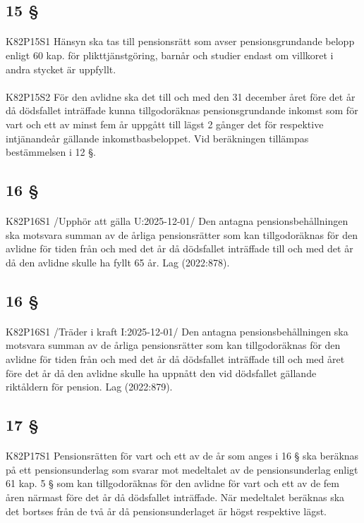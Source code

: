 \documentclass[a4paper,notitlepage,openany,10pt]{book}
\begin{document}
\subsection*{15 §}
\paragraph*{}
{\tiny K82P15S1}
Hänsyn ska tas till pensionsrätt som avser pensionsgrundande belopp enligt 60 kap. för plikttjänstgöring, barnår och studier endast om villkoret i andra stycket är uppfyllt.
\paragraph*{}
{\tiny K82P15S2}
För den avlidne ska det till och med den 31 december året före det år då dödsfallet inträffade kunna tillgodoräknas pensionsgrundande inkomst som för vart och ett av minst fem år uppgått till lägst 2 gånger det för respektive intjänandeår gällande inkomstbasbeloppet. Vid beräkningen tillämpas bestämmelsen i 12 §.
\subsection*{16 §}
\paragraph*{}
{\tiny K82P16S1}
/Upphör att gälla U:2025-12-01/
Den antagna pensionsbehållningen ska motsvara summan av de årliga pensionsrätter som kan tillgodoräknas för den avlidne för tiden från och med det år då dödsfallet inträffade till och med det år då den avlidne skulle ha fyllt 65 år.
Lag (2022:878).
\subsection*{16 §}
\paragraph*{}
{\tiny K82P16S1}
/Träder i kraft I:2025-12-01/
Den antagna pensionsbehållningen ska motsvara summan av de årliga pensionsrätter som kan tillgodoräknas för den avlidne för tiden från och med det år då dödsfallet inträffade till och med året före det år då den avlidne skulle ha uppnått den vid dödsfallet gällande riktåldern för pension.
Lag (2022:879).
\subsection*{17 §}
\paragraph*{}
{\tiny K82P17S1}
Pensionsrätten för vart och ett av de år som anges i 16 § ska beräknas på ett pensionsunderlag som svarar mot medeltalet av de pensionsunderlag enligt 61 kap. 5 § som kan tillgodoräknas för den avlidne för vart och ett av de fem åren närmast före det år då dödsfallet inträffade.
När medeltalet beräknas ska det bortses från de två år då pensionsunderlaget är högst respektive lägst.
\end{document}
